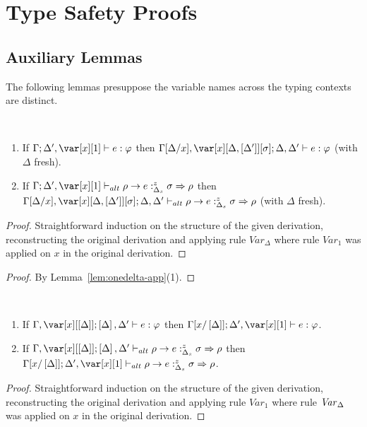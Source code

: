 \documentclass[acmsmall,review,anonymous]{acmart}
\begin{document}
\section{Type Safety Proofs}\label{app:proofs}

\subsection{Auxiliary Lemmas}
The following lemmas presuppose the variable names across the typing
contexts are distinct.

  \begin{lemma}~\label{lem:onedelta-app}

    \begin{enumerate}
    
      \item If $\G; \D',\xl \vdash e :\vp$
        then $\G[\D/x],\xD; \D,\D' \vdash e : \vp$ (with $\Delta$ fresh).
      \item If $\G ; \D' , \xl \vdash_{alt} \rho \rightarrow e
        :^z_{\Delta_s} \sigma \Rightarrow \rho$ then
        $\G[\D/x],\xD;\D,\D' \vdash_{alt} \rho \rightarrow e
        :^z_{\Delta_s} \sigma \Rightarrow \rho$ (with $\Delta$ fresh).
   
      \end{enumerate}
\end{lemma}
\begin{proof}
Straightforward induction on the structure of the given derivation,
reconstructing the original derivation and applying rule
$\mathit{Var}_\Delta$ where rule $\mathit{Var}_1$ was applied on
$x$ in the original derivation.
\end{proof}
\onedelta*

\begin{proof}
By Lemma~\ref{lem:onedelta-app}(1).
\end{proof}



\begin{lemma}~\label{lem:deltaone-app}

  \begin{enumerate}
 \item If $\G,\x[\irr{\D}]; \irr{\D},\D' \vdash e : \vp$
   then $\G[x/\irr{\D}]; \D',\xl \vdash e :\vp$.
 \item If $\G ,\x[\irr{\D}]; \irr{\D}, \D' \vdash_{alt} \rho \rightarrow e
   :^z_{\Delta_s} \sigma \Rightarrow \rho$ then
   $\G[x/\irr{\D}];\D',\xl \vdash_{alt} \rho \rightarrow e
   :^z_{\Delta_s} \sigma \Rightarrow \rho$.
  \end{enumerate}
\end{lemma}
\begin{proof}
Straightforward induction on the structure of the given derivation,
reconstructing the original derivation and applying rule
$\mathit{Var}_1$ where rule $\mathit{Var}_\Delta$ was applied on
$x$ in the original derivation.
\end{proof}
\end{document}
